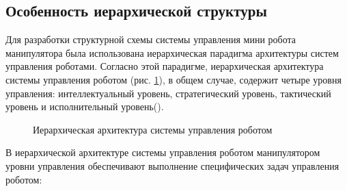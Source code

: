 \subsection{Особенность иерархической структуры}
Для разработки структурной схемы системы управления мини робота манипулятора была использована иерархическая парадигма архитектуры систем управления роботами. Согласно этой парадигме, иерархическая архитектура системы управления роботом (рис. \ref{Hierar}), в общем случае, содержит четыре уровня управления: интеллектуальный уровень, стратегический уровень, тактический уровень и исполнительный уровень(\citep{Khatib1997}).

\begin{figure}[H]
	\centering
	
	\caption{Иерархическая архитектура системы управления роботом}
	\label{Hierar}
\end{figure}

В иерархической архитектуре системы управления роботом манипулятором уровни управления обеспечивают выполнение специфических задач управления роботом:

